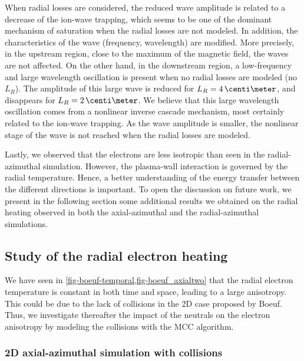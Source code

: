When radial losses are considered, the reduced wave amplitude is related to a decrease of the ion-wave trapping, which seems to be one of the dominant mechanism of saturation when the radial losses are not modeled.
In addition, the characteristics of the wave (frequency, wavelength) are modified.
More precisely, in the upstream region, close to the maximum of the magnetic field, the waves are not affected.
On the other hand,  in the downstream region, a low-frequency and large wavelength oscillation is present when no radial losses are modeled (no $L_R$).
The amplitude of this large wave is reduced for $L_R=4\,\centi\meter$, and disappears for $L_R=2\,\centi\meter$.
We believe that this large wavelength oscillation comes from a nonlinear inverse cascade mechanism, most certainly related to the ion-wave trapping.
As the wave amplitude is smaller, the nonlinear stage of the wave is not reached when the radial losses are modeled.


\vspace{1em}
Lastly, we observed that the electrons are less isotropic than seen in the radial-azimuthal simulation.
However, the plasma-wall interaction is governed by the radial temperature.
Hence, a better understanding of the energy transfer between the different directions is important.
To open the discussion on future work, we present in the following section some additional results we obtained on the radial heating observed in both the axial-azimuthal and the radial-azimuthal simulations.


\subsection{Study of the radial electron heating}
\label{sec-rheating}
    We have seen in \cref{fig-boeuf-temporal,fig-boeuf_axialtwo} that the radial electron temperature is constant in both time and space, leading to a large anisotropy.
    This could be due to the lack of collisions in the \ac{2D} \ztheta case proposed by Boeuf.
    Thus, we investigate thereafter the impact of the neutrals on the electron anisotropy by modeling the collisions with the \ac{MCC} algorithm.
    
  \subsubsection{2D axial-azimuthal simulation with collisions} \label{subsec-MCC_boeuf}

